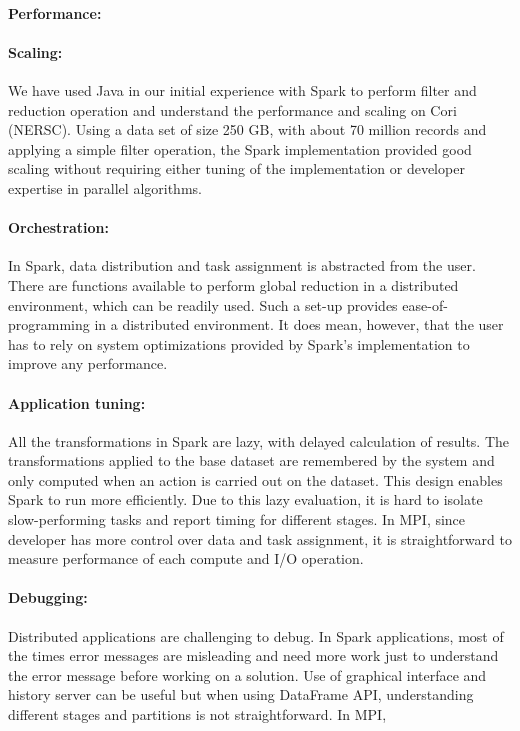 \documentclass[11pt, twocolumn]{article}
\begin{document}
\paragraph{Performance: } 


 
\paragraph{Scaling: }
We have used Java in our initial experience with Spark to perform filter and reduction 
operation and understand the performance and scaling on Cori (NERSC). 
Using a data set of size 250 GB, with about 70 million records and applying a simple filter operation, 
the Spark implementation provided good
  scaling without requiring either tuning of the implementation or
  developer expertise in parallel algorithms. 
   

 \paragraph{Orchestration: } 
In Spark, data distribution and task assignment
  is abstracted from the user. There are functions available to
  perform global reduction in a distributed environment, which can be
  readily used.  Such a set-up provides ease-of-programming in a
  distributed environment. It does mean, however, that the user has to
  rely on system optimizations provided by Spark's implementation to
  improve any performance.

  \paragraph{Application tuning: } All the transformations in Spark
  are lazy, with delayed calculation of results. The transformations
  applied to the base dataset are remembered by the system
  and only computed when an action is carried out on the dataset.
  This design enables Spark to run more efficiently. 
  Due to this lazy evaluation, it is hard to isolate slow-performing tasks and report
  timing for different stages. 
  In MPI, since developer has more control over data and task assignment, it is 
  straightforward to measure performance of each compute and I/O operation.  

\paragraph{Debugging: } 
Distributed applications are challenging to debug. 
In Spark applications, 
most of the times error messages are misleading and need more work
just to understand the error message before working on
a solution. Use of graphical interface and history server can
be useful but when using DataFrame API, understanding
different stages and partitions is not straightforward. 
In MPI, 
\end{document}
